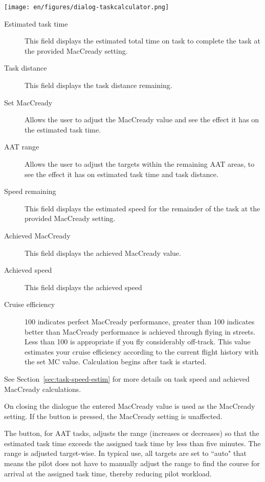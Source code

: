 \begin{center}
\texttt{[image: en/figures/dialog-taskcalculator.png]}
\end{center}

\begin{description}
\item[Estimated task time]  This field displays the estimated total time 
  on task to complete the task at the provided MacCready setting.
\item[Task distance]  This field displays the task distance remaining.
\item[Set MacCready]  Allows the user to adjust the MacCready value and 
  see the effect it has on the estimated task time.
\item[AAT range]  Allows the user to adjust the targets within the remaining 
  AAT areas, to see the effect it has on estimated task time and task distance.
\item[Speed remaining]  This field displays the estimated speed for the
  remainder of the task at the provided MacCready setting.
\item[Achieved MacCready]  This field displays the achieved MacCready value.
\item[Achieved speed]  This field displays the achieved speed %
\item[Cruise efficiency]  100 indicates perfect MacCready performance, greater 
than 100 indicates better than MacCready performance is achieved through flying
in streets. Less than 100 is appropriate if you fly considerably off-track. This 
value estimates your cruise efficiency according to the current flight history 
with the set MC value. Calculation begins after task is started.
\end{description}
See Section~\ref{sec:task-speed-estim} for more details on task speed
and achieved MacCready calculations.

On closing the dialogue the entered MacCready value is used as the MacCready 
setting. If the  button is pressed, the MacCready setting is 
unaffected.

The  button, for AAT tasks, adjusts the range
(increases or decreases) so that the estimated task time exceeds the
assigned task time by less than five minutes.  The range is adjusted
target-wise. In typical use, all targets are set to ``auto" that means the pilot 
does not have to manually adjust the range to find the course for arrival at 
the assigned task time, thereby reducing pilot workload.

